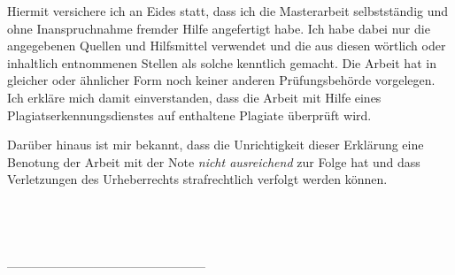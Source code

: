 \documentclass[11pt]{article}
\begin{document}
\noindent
Hiermit versichere ich an Eides statt, dass ich die Masterarbeit selbstständig und ohne Inanspruchnahme fremder Hilfe angefertigt habe. Ich habe dabei nur die angegebenen Quellen und Hilfsmittel verwendet und die aus diesen wörtlich oder inhaltlich entnommenen Stellen als solche kenntlich gemacht. Die Arbeit hat in gleicher oder ähnlicher Form noch keiner anderen Prüfungsbehörde vorgelegen. Ich erkläre mich damit
einverstanden, dass die Arbeit mit Hilfe eines Plagiatserkennungsdienstes auf enthaltene Plagiate überprüft wird. 

Darüber hinaus ist mir bekannt, dass die Unrichtigkeit dieser Erklärung eine Benotung der 
Arbeit mit der Note \textit{nicht ausreichend} zur Folge hat und dass Verletzungen des Urheberrechts strafrechtlich verfolgt werden können. 
\\ \\ \\ \\ \\

------------------------------------------------
\end{document}
